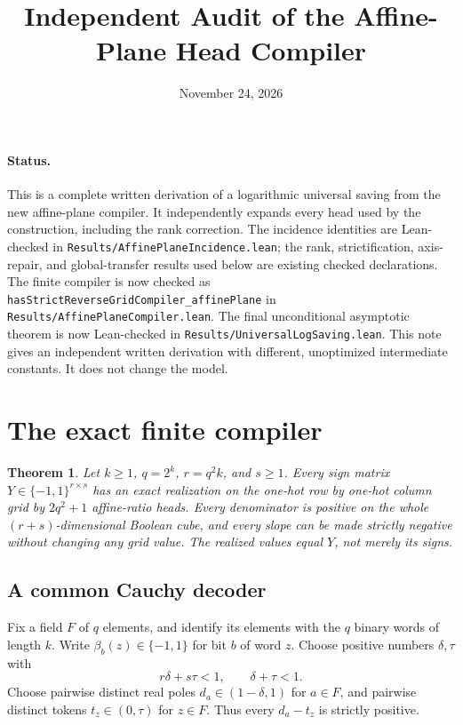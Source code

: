 \documentclass[11pt]{article}
\title{Independent Audit of the Affine-Plane Head Compiler}
\author{}
\date{November 24, 2026}
\newtheorem{theorem}{Theorem}
\begin{document}
\maketitle

\paragraph{Status.}
This is a complete written derivation of a logarithmic universal saving
from the new affine-plane compiler. It independently expands every head
used by the construction, including the rank correction. The incidence
identities are Lean-checked in
\texttt{Results/AffinePlaneIncidence.lean}; the rank, strictification,
axis-repair, and global-transfer results used below are existing checked
declarations. The finite compiler is now checked as
\texttt{hasStrictReverseGridCompiler\_affinePlane} in
\texttt{Results/AffinePlaneCompiler.lean}. The final unconditional
asymptotic theorem is now Lean-checked in
\texttt{Results/UniversalLogSaving.lean}. This note gives an independent
written derivation with different, unoptimized intermediate constants.
It does not change the model.

\section{The exact finite compiler}

\begin{theorem}\label{thm:finite}
Let $k\ge1$, $q=2^k$, $r=q^2k$, and $s\ge1$. Every sign matrix
$Y\in\{-1,1\}^{r\times s}$ has an exact realization on the one-hot
row by one-hot column grid by $2q^2+1$ affine-ratio heads. Every
denominator is positive on the whole $(r+s)$-dimensional Boolean cube,
and every slope can be made strictly negative without changing any grid
value. The realized values equal $Y$, not merely its signs.
\end{theorem}

\subsection{A common Cauchy decoder}
Fix a field $F$ of $q$ elements, and identify its elements with the
$q$ binary words of length $k$. Write $\beta_b(z)\in\{-1,1\}$
for bit $b$ of word $z$. Choose positive numbers $\delta,\tau$ with
\[
 r\delta+s\tau<1,
 \qquad \delta+\tau<1.
 \tag{1}
\]
Choose pairwise distinct real poles $d_a\in(1-\delta,1)$ for
$a\in F$, and pairwise distinct tokens $t_z\in(0,\tau)$ for
$z\in F$. Thus every $d_a-t_z$ is strictly positive.
\end{document}
